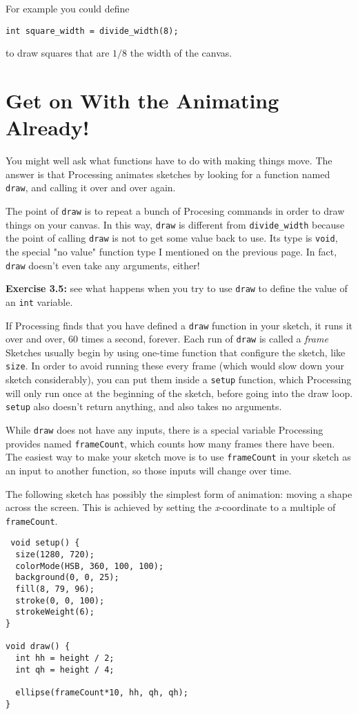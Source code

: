 \documentclass[
]{leaflet}
\begin{document}
For example you could define
\begin{lstlisting}
int square_width = divide_width(8);
\end{lstlisting}
\vspace{-0.5em}
to draw squares that are $1/8$ the width of the canvas.

\section{Get on With the Animating Already!}

You might well ask what functions have to do with making things move.
The answer is that Processing animates sketches by looking for a function named \texttt{draw}, and calling it over and over again.

The point of \texttt{draw} is to repeat a bunch of Procesing commands in order to draw things on your canvas.
In this way, \texttt{draw} is different from \texttt{divide\_width} because the point of calling \texttt{draw} is not to get some value back to use.
Its type is \texttt{void}, the special "no value" function type I mentioned on the previous page.
In fact, \texttt{draw} doesn't even take any arguments, either!

\textbf{Exercise 3.5:} see what happens when you try to use \texttt{draw} to define the value of an \texttt{int} variable.

If Processing finds that you have defined a \texttt{draw} function in your sketch, it runs it over and over, 60 times a second, forever.
Each run of \texttt{draw} is called a \textit{frame}
Sketches usually begin by using one-time function that configure the sketch, like \texttt{size}.
In order to avoid running these every frame (which would slow down your sketch considerably), you can put them inside a \texttt{setup} function, which Processing will only run once at the beginning of the sketch, before going into the draw loop.
\texttt{setup} also doesn't return anything, and also takes no arguments.

While \texttt{draw} does not have any inputs, there is a special variable Processing provides named \texttt{frameCount}, which counts how many frames there have been.
The easiest way to make your sketch move is to use \texttt{frameCount} in your sketch as an input to another function, so those inputs will change over time.

The following sketch has possibly the simplest form of animation: moving a shape across the screen.
This is achieved by setting the \textit{x}-coordinate to a multiple of \texttt{frameCount}.
\begin{lstlisting}
 void setup() {
  size(1280, 720);
  colorMode(HSB, 360, 100, 100);
  background(0, 0, 25);
  fill(8, 79, 96);
  stroke(0, 0, 100);
  strokeWeight(6);
}

void draw() {
  int hh = height / 2;
  int qh = height / 4;

  ellipse(frameCount*10, hh, qh, qh);
}
\end{lstlisting}
\end{document}
